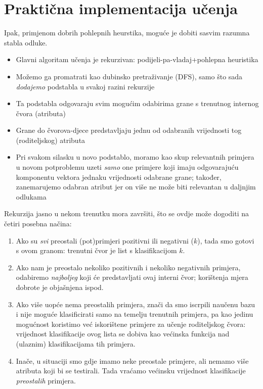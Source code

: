 \documentclass{beamer}
\begin{document}
\section{Praktična implementacija učenja}
\begin{frame}
Ipak, primjenom dobrih pohlepnih heurstika, moguće je dobiti sasvim razumna stabla odluke.
\begin{itemize}
    \item Glavni algoritam učenja je rekurzivan: podijeli-pa-vladaj+pohlepna heuristika
    \item Možemo ga promatrati kao dubinsko pretraživanje (DFS), samo što sada \emph{dodajemo} podstabla u svakoj razini rekurzije
    \item Ta podstabla odgovaraju svim mogućim odabirima grane s trenutnog internog čvora (atributa)
    \item Grane do čvorova-djece predstavljaju jednu od odabranih vrijednosti tog (roditeljskog) atributa
    \item Pri svakom silasku u novo podstablo, moramo kao skup relevantnih primjera u novom potproblemu uzeti \emph{samo} one
primjere koji imaju odgovarajuću komponentu vektora jednaku vrijednosti odabrane grane; također, zanemarujemo odabran atribut jer on više
ne može biti relevantan u daljnjim odlukama
\end{itemize}
\end{frame}

\begin{frame} 
Rekurzija jasno u nekom trenutku mora završiti, što se ovdje može dogoditi na četiri posebna načina:
\begin{enumerate}
    \item Ako su \emph{svi} preostali (pot)primjeri pozitivni ili negativni ($k$), tada smo gotovi s ovom granom: trenutni čvor je list s klasifikacijom $k$.
    \item Ako nam je preostalo nekoliko pozitivnih i nekoliko negativnih primjera, odabiremo \emph{najboljeg} koji će predstavljati ovaj interni čvor;
    korištenja mjera dobrote je objašnjena ispod.
    \item Ako više uopće nema preostalih primjera, znači da smo iscrpili naučenu bazu i nije moguće klasificirati samo na temelju trenutnih primjera,
    pa kao jedinu mogućnost koristimo već iskorištene primjere za učenje roditeljskog čvora: vrijednost klasifikacije ovog lista se dobiva kao većinska
    funkcija nad (ulaznim) klasifikacijama tih primjera.
    \item Inače, u situaciji smo gdje imamo neke preostale primjere, ali nemamo više atributa koji bi se testirali. Tada vraćamo većinsku
    vrijednost klasifikacije \emph{preostalih} primjera.
\end{enumerate}
\end{frame}
\end{document}
